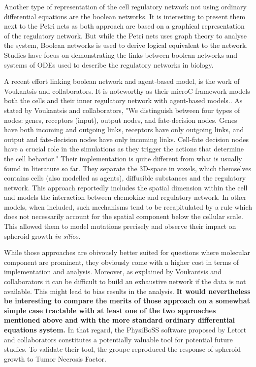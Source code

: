 \documentclass[11pt,a4paper]{article}
\begin{document}
Another type of representation of the cell regulatory network not using ordinary differential equations are the boolean networks. It is interesting to present them next to the Petri nets as both approach are based on a graphical representation of the regulatory network. But while the Petri nets uses graph theory to analyse the system, Boolean networks is used to derive logical equivalent to the network.\cite{Thomas1995} Studies have focus on demonstrating the links between boolean networks and systems of ODEs used to describe the regulatory networks in biology. \cite{Davidich2008}

A recent effort linking boolean network and agent-based model, is the work of Voukantsis and collaborators. It is noteworthy as their microC framework models both the cells and their inner regulatory network with agent-based models.\cite{Voukantsis2019}. As stated by Voukantsis and collaborators, "We distinguish between four types of nodes: genes, receptors (input), output nodes, and fate-decision nodes. Genes have both incoming and outgoing links, receptors have only outgoing links, and output and fate-decision nodes have only incoming links. Cell-fate decision nodes have a crucial role in the simulations as they trigger the actions that determine the cell behavior." Their implementation is quite different from what is usually found in literature so far. They separate the 3D-space in voxels, which themselves contains cells (also modelled as agents), diffusible substances and the regulatory network. This approach reportedly includes the spatial dimension within the cell and models the interaction between chemokine and regulatory network. In other models, when included, such mechanisms tend to be recapitulated by a rule which  does not necessarily account for the spatial component below the cellular scale. This allowed them to model mutations precisely and observe their impact on spheroid growth \textit{in silico}.

While those approaches are obivously better suited for questions where molecular component are prominent, they obviously come with a higher cost in terms of implementation and analysis. Moreover, as explained by Voukantsis and collaborators it can be difficult to build an exhaustive network if the data is not available. This might lead to bias results in the analysis. \textbf{It would nevertheless be interesting to compare the merits of those approach on a somewhat simple case tractable with at least one of the two approaches mentioned above and with the more standard ordinary differential equations system.} In that regard, the PhysiBoSS software proposed by Letort and collaborators constitutes a potentially valuable tool for potential future studies.\cite{Letort2018} To validate their tool, the groupe reproduced the response of spheroid growth to Tumor Necrosis Factor.
\end{document}
